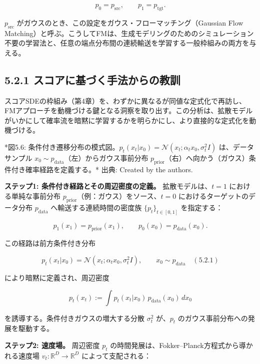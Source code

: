 \[
p_0 = p_{\mathrm{src}}, \qquad p_1 = p_{\mathrm{tgt}}.
\]


$p_{\mathrm{src}}$ がガウスのとき、この設定をガウス・フローマッチング（Gaussian Flow Matching）と呼ぶ。こうしてFMは、生成モデリングのためのシミュレーション不要の学習法と、任意の端点分布間の連続輸送を学習する一般枠組みの両方を与える。


\subsection*{5.2.1 スコアに基づく手法からの教訓}


スコアSDEの枠組み（第4章）を、わずかに異なるが同値な定式化で再訪し、FMアプローチを動機づける鍵となる洞察を取り出す。この分析は、拡散モデルがいかにして確率流を暗黙に学習するかを明らかにし、より直接的な定式化を動機づける。



*図5.6: 条件付き遷移分布の模式図。$p_t(x_t|x_0)=\mathcal{N}(x_t;\alpha_t x_0,\sigma_t^2 I)$ は、データサンプル $x_0\sim p_{\mathrm{data}}$（左）からガウス事前分布 $p_{\mathrm{prior}}$（右）へ向かう（ガウス）条件付き確率経路を定義する。*
出典: Created by the authors.

\textbf{ステップ1: 条件付き経路とその周辺密度の定義。} 拡散モデルは、$t=1$ における単純な事前分布 $p_{\mathrm{prior}}$（例：ガウス）をソース、$t=0$ におけるターゲットのデータ分布 $p_{\mathrm{data}}$ へ輸送する連続時間の密度族 $\{p_t\}_{t\in[0,1]}$ を指定する：

\[
p_1(x_1)=p_{\mathrm{prior}}(x_1),\qquad p_0(x_0)=p_{\mathrm{data}}(x_0).
\]


この経路は前方条件付き分布

\[
p_t(x_t|x_0)=\mathcal{N}(x_t;\alpha_t x_0,\sigma_t^2 I),\qquad x_0\sim p_{\mathrm{data}} \quad (5.2.1)
\]


により暗黙に定義され、周辺密度

\[
p_t(x_t):=\int p_t(x_t|x_0)\,p_{\mathrm{data}}(x_0)\,dx_0
\]


を誘導する。条件付きガウスの増大する分散 $\sigma_t^2$ が、$p_t$ のガウス事前分布への発展を駆動する。

\textbf{ステップ2: 速度場。} 周辺密度 $p_t$ の時間発展は、Fokker–Planck方程式から導かれる速度場 $v_t:\mathbb{R}^D\to\mathbb{R}^D$ によって支配される：

